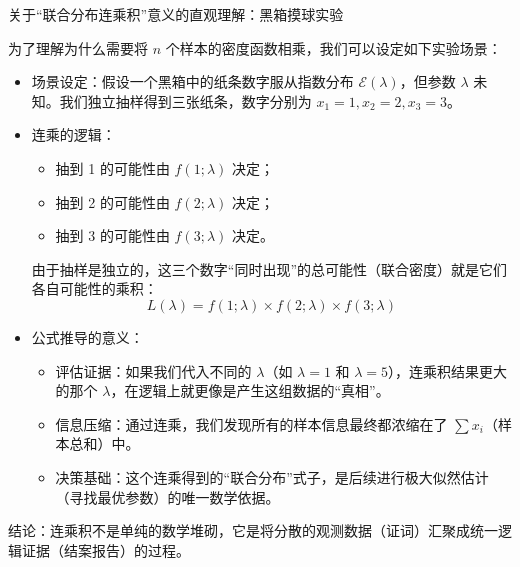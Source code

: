 \begin{note}
关于“联合分布连乘积”意义的直观理解：黑箱摸球实验

为了理解为什么需要将 $n$ 个样本的密度函数相乘，我们可以设定如下实验场景：

\begin{itemize}
    \item 场景设定：假设一个黑箱中的纸条数字服从指数分布 $\mathcal{E}(\lambda)$，但参数 $\lambda$ 未知。我们独立抽样得到三张纸条，数字分别为 $x_1=1, x_2=2, x_3=3$。
    
    \item 连乘的逻辑：
    \begin{itemize}
        \item 抽到 1 的可能性由 $f(1; \lambda)$ 决定；
        \item 抽到 2 的可能性由 $f(2; \lambda)$ 决定；
        \item 抽到 3 的可能性由 $f(3; \lambda)$ 决定。
    \end{itemize}
    由于抽样是独立的，这三个数字“同时出现”的总可能性（联合密度）就是它们各自可能性的乘积：
    \[ L(\lambda) = f(1; \lambda) \times f(2; \lambda) \times f(3; \lambda) \]

    \item 公式推导的意义：
    \begin{itemize}
        \item 评估证据：如果我们代入不同的 $\lambda$（如 $\lambda=1$ 和 $\lambda=5$），连乘积结果更大的那个 $\lambda$，在逻辑上就更像是产生这组数据的“真相”。
        \item 信息压缩：通过连乘，我们发现所有的样本信息最终都浓缩在了 $\sum x_i$（样本总和）中。
        \item 决策基础：这个连乘得到的“联合分布”式子，是后续进行极大似然估计（寻找最优参数）的唯一数学依据。
    \end{itemize}
\end{itemize}

结论：连乘积不是单纯的数学堆砌，它是将分散的观测数据（证词）汇聚成统一逻辑证据（结案报告）的过程。
\end{note}
